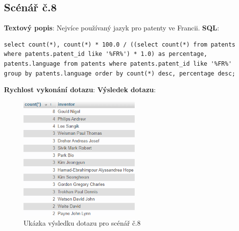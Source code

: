 \subsection{Scénář č.8}
\textbf{Textový popis}: Nejvíce používaný jazyk pro patenty ve Francii.
\newline
\textbf{SQL}: 
\begin{lstlisting}[label = {lst:elements_a}]
select count(*), count(*) * 100.0 / ((select count(*) from patents where patents.patent_id like '%FR%') * 1.0) as percentage, patents.language from patents where patents.patent_id like '%FR%' group by patents.language order by count(*) desc, percentage desc;
\end{lstlisting}
\textbf{Rychlost vykonání dotazu}: 
\newline
\textbf{Výsledek dotazu}:
\begin{figure}[H]
\centering
\includegraphics[width=6cm]{img/scenare/scenar_9}
\caption{Ukázka výsledku dotazu pro scénář č.8}
\label{fig:scenar8}
\end{figure}

